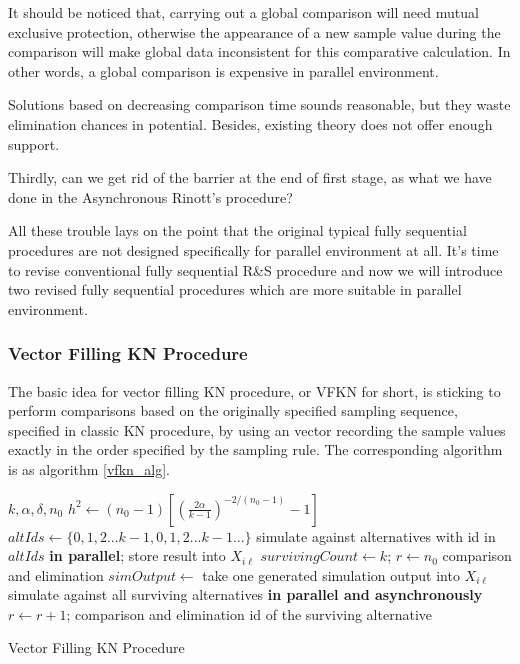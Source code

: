 It should be noticed that, carrying out a global comparison will need mutual exclusive protection, otherwise the appearance of a new sample value during the comparison will make global data inconsistent for this comparative calculation. In other words, a global comparison is expensive in parallel environment.

Solutions based on decreasing comparison time sounds reasonable, but they waste elimination chances in potential. Besides, existing theory does not offer enough support.

Thirdly, can we get rid of the barrier at the end of first stage, as what we have done in the Asynchronous Rinott's procedure?

All these trouble lays on the point that the original typical fully sequential procedures are not designed specifically for parallel environment at all. It's time to revise conventional fully sequential R\&S procedure and now we will introduce two revised fully sequential procedures which are more suitable in parallel environment.

\subsubsection{Vector Filling KN Procedure}

The basic idea for vector filling KN procedure, or VFKN for short, is sticking to perform comparisons based on the originally specified sampling sequence, specified in classic KN procedure, by using an vector recording the sample values exactly in the order specified by the sampling rule. The corresponding algorithm is as algorithm \ref{vfkn_alg}.

\begin{algorithm}
\begin{algorithmic}[1]
\Require $k, \alpha, \delta, n_0$
\State $h^2 \gets (n_0 -1)[(\frac{2\alpha}{k - 1})^{-2/(n_0-1)} - 1]$
\State $altIds \gets \{0, 1, 2...k - 1, 0, 1, 2...k - 1...\}$ 
\State simulate against alternatives with id in $altIds$ \textbf{in parallel}; store result into $X_{i\ell}$
\State $survivingCount \gets k$; $r \gets n_0$
\State comparison and elimination
  \State $simOutput \gets $ take one generated simulation output into $X_{i\ell}$
  \State simulate against all surviving alternatives \textbf{in parallel and asynchronously}
    \State $r \gets r + 1$; comparison and elimination
  \EndIf
\EndWhile
\State \Return id of the surviving alternative
\end{algorithmic}
\caption{Vector Filling KN Procedure}
\label{vfkn_alg}
\end{algorithm}

